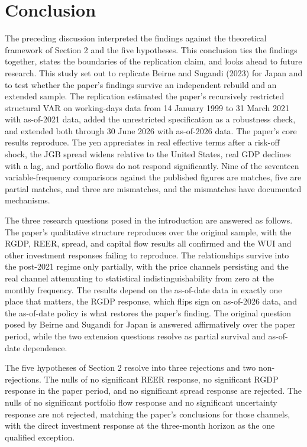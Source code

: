 \section{Conclusion}

The preceding discussion interpreted the findings against the theoretical framework of Section 2 and the five hypotheses. This conclusion ties the findings together, states the boundaries of the replication claim, and looks ahead to future research. This study set out to replicate Beirne and Sugandi (2023) for Japan and to test whether the paper's findings survive an independent rebuild and an extended sample. The replication estimated the paper's recursively restricted structural VAR on working-days data from 14 January 1999 to 31 March 2021 with as-of-2021 data, added the unrestricted specification as a robustness check, and extended both through 30 June 2026 with as-of-2026 data. The paper's core results reproduce. The yen appreciates in real effective terms after a risk-off shock, the JGB spread widens relative to the United States, real GDP declines with a lag, and portfolio flows do not respond significantly. Nine of the seventeen variable-frequency comparisons against the published figures are matches, five are partial matches, and three are mismatches, and the mismatches have documented mechanisms.

The three research questions posed in the introduction are answered as follows. The paper's qualitative structure reproduces over the original sample, with the RGDP, REER, spread, and capital flow results all confirmed and the WUI and other investment responses failing to reproduce. The relationships survive into the post-2021 regime only partially, with the price channels persisting and the real channel attenuating to statistical indistinguishability from zero at the monthly frequency. The results depend on the as-of-date data in exactly one place that matters, the RGDP response, which flips sign on as-of-2026 data, and the as-of-date policy is what restores the paper's finding. The original question posed by Beirne and Sugandi for Japan is answered affirmatively over the paper period, while the two extension questions resolve as partial survival and as-of-date dependence.

The five hypotheses of Section 2 resolve into three rejections and two non-rejections. The nulls of no significant REER response, no significant RGDP response in the paper period, and no significant spread response are rejected. The nulls of no significant portfolio flow response and no significant uncertainty response are not rejected, matching the paper's conclusions for those channels, with the direct investment response at the three-month horizon as the one qualified exception.

